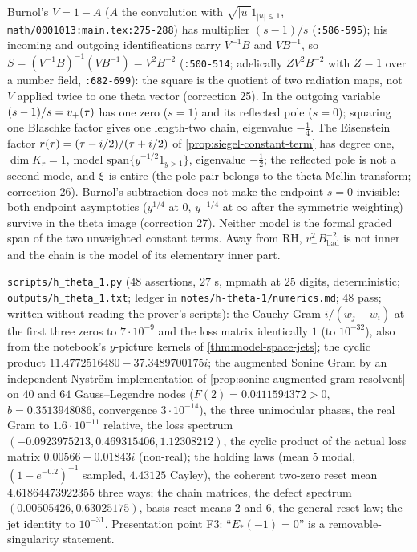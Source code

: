 \begin{proposition}
\label{prop:burnol-even-sector-dictionary}
Burnol's $V = 1-A$ ($A$ the convolution with $\sqrt{|u|}1_{|u|\le1}$, \texttt{math/0001013:main.tex:275-288}) has
multiplier $(s-1)/s$ (\texttt{:586-595}); his incoming and outgoing identifications carry $V^{-1}B$ and $VB^{-1}$, so
$S = (V^{-1}B)^{-1}(VB^{-1}) = V^2B^{-2}$ (\texttt{:500-514}; adelically $ZV^2B^{-2}$ with $Z = 1$ over a number field,
\texttt{:682-699}): the square is the quotient of two radiation maps, not $V$ applied twice to one theta vector
(correction 25). In the outgoing variable $(s-1)/s = v_+(\tau)$ has one zero ($s = 1$) and its reflected pole ($s = 0$);
squaring one Blaschke factor gives one length-two chain, eigenvalue $-\tfrac14$. The Eisenstein factor
$r(\tau) = (\tau-i/2)/(\tau+i/2)$ of \cref{prop:siegel-constant-term} has degree one, $\dim K_r = 1$, model
$\mathrm{span}\{y^{-1/2}1_{y>1}\}$, eigenvalue $-\tfrac12$; the reflected pole is not a second mode, and $\xi$ is entire (the
pole pair belongs to the theta Mellin transform; correction 26). Burnol's subtraction does not make the endpoint
$s = 0$ invisible: both endpoint asymptotics ($y^{1/4}$ at $0$, $y^{-1/4}$ at $\infty$ after the symmetric weighting)
survive in the theta image (correction 27). Neither model is the formal graded span of the two unweighted constant
terms. Away from RH, $v_+^2B_{\mathrm{bad}}^{-2}$ is not inner and the chain is the model of its elementary inner part.
\end{proposition}

\begin{numerical}
\label{num:h-theta-1}
\texttt{scripts/h\_theta\_1.py} ($48$ assertions, $27$ s, mpmath at $25$ digits, deterministic; \texttt{outputs/h\_theta\_1.txt};
ledger in \texttt{notes/h-theta-1/numerics.md}; $48$ pass; written without reading the prover's scripts): the Cauchy Gram
$i/(w_j-\bar w_i)$ at the first three zeros to $7\cdot10^{-9}$ and the loss matrix identically $1$ (to $10^{-32}$), also from
the notebook's $y$-picture kernels of \cref{thm:model-space-jets}; the cyclic product $11.4772516480-37.3489700175i$; the
augmented Sonine Gram by an independent Nystr\"om implementation of \cref{prop:sonine-augmented-gram-resolvent} on $40$ and
$64$ Gauss--Legendre nodes ($F(2) = 0.0411594372>0$, $b = 0.3513948086$, convergence $3\cdot10^{-14}$), the three unimodular
phases, the real Gram to $1.6\cdot10^{-11}$ relative, the loss spectrum $(-0.0923975213, 0.469315406, 1.12308212)$, the
cyclic product of the actual loss matrix $0.00566-0.01843i$ (non-real); the holding laws (mean $5$ modal, $(1-e^{-0.2})^{-1}$
sampled, $4.43125$ Cayley), the coherent two-zero reset mean $4.61864473922355$ three ways; the chain matrices, the defect
spectrum $(0.00505426, 0.63025175)$, basis-reset means $2$ and $6$, the general reset law; the jet identity to $10^{-31}$.
Presentation point F3: ``$E_{*}(-1) = 0$'' is a removable-singularity statement.
\end{numerical}

